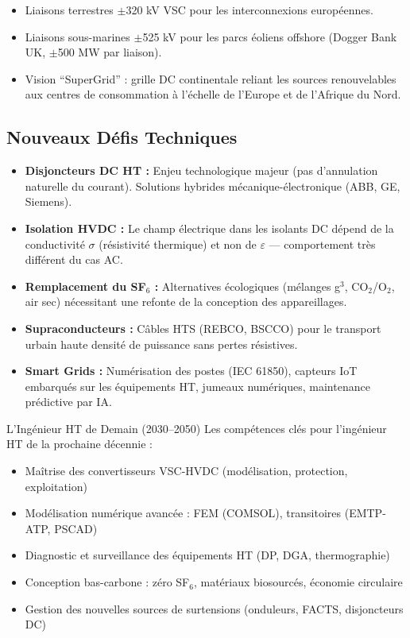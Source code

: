 \documentclass[12pt, a4paper, twoside]{report}
\begin{document}
\begin{itemize}
  \item Liaisons terrestres $\pm$320 kV VSC pour les interconnexions européennes.
  \item Liaisons sous-marines $\pm$525 kV pour les parcs éoliens offshore
    (Dogger Bank UK, $\pm$500 MW par liaison).
  \item Vision ``SuperGrid'' : grille DC continentale reliant les sources
    renouvelables aux centres de consommation à l'échelle de l'Europe et de l'Afrique du Nord.
\end{itemize}

\subsection{Nouveaux Défis Techniques}

\begin{itemize}
  \item \textbf{Disjoncteurs DC HT :} Enjeu technologique majeur (pas d'annulation naturelle
    du courant). Solutions hybrides mécanique-électronique (ABB, GE, Siemens).
  \item \textbf{Isolation HVDC :} Le champ électrique dans les isolants DC dépend de la
    conductivité $\sigma$ (résistivité thermique) et non de $\varepsilon$ — comportement
    très différent du cas AC.
  \item \textbf{Remplacement du SF$_6$ :} Alternatives écologiques (mélanges g$^3$,
    CO$_2$/O$_2$, air sec) nécessitant une refonte de la conception des appareillages.
  \item \textbf{Supraconducteurs :} Câbles HTS (REBCO, BSCCO) pour le transport urbain
    haute densité de puissance sans pertes résistives.
  \item \textbf{Smart Grids :} Numérisation des postes (IEC 61850), capteurs IoT embarqués
    sur les équipements HT, jumeaux numériques, maintenance prédictive par IA.
\end{itemize}

\begin{retenir}{L'Ingénieur HT de Demain (2030--2050)}
Les compétences clés pour l'ingénieur HT de la prochaine décennie :
\begin{itemize}
  \item Maîtrise des convertisseurs VSC-HVDC (modélisation, protection, exploitation)
  \item Modélisation numérique avancée : FEM (COMSOL), transitoires (EMTP-ATP, PSCAD)
  \item Diagnostic et surveillance des équipements HT (DP, DGA, thermographie)
  \item Conception bas-carbone : zéro SF$_6$, matériaux biosourcés, économie circulaire
  \item Gestion des nouvelles sources de surtensions (onduleurs, FACTS, disjoncteurs DC)
\end{itemize}
\end{retenir}
\end{document}
